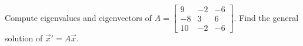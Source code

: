\documentclass{ximera}
\begin{document}
\begin{exercise}
    \begin{tasks}
        \task Compute eigenvalues and eigenvectors of
        $A = 
        \left[ 
            \begin{smallmatrix}
                9 & -2 & -6 \\
                -8 & 3 & 6 \\
                10 & -2 & -6
            \end{smallmatrix} 
        \right]$.
        \task Find the general solution of ${\vec{x}}' = A \vec{x}$.
    \end{tasks}
\end{exercise}
\end{document}

